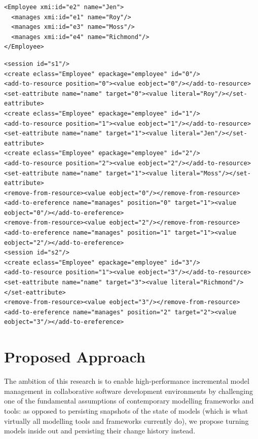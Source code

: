 \documentclass{llncs}
\begin{document}
\begin{lstlisting}[style=xmi,caption={State-based representation of the model of Figure \ref{fig:modified_chart} in (simplified) XMI.},label=lst:xmimodel]
<Employee xmi:id="e2" name="Jen">
  <manages xmi:id="e1" name="Roy"/>
  <manages xmi:id="e3" name="Moss"/>
  <manages xmi:id="e4" name="Richmond"/>
</Employee>
\end{lstlisting}


\begin{lstlisting}[style=xml,caption={Change-based representation of the model of Figure \ref{fig:modified_chart}.},label=lst:cbpmodel]
<session id="s1"/>
<create eclass="Employee" epackage="employee" id="0"/>
<add-to-resource position="0"><value eobject="0"/></add-to-resource>
<set-eattribute name="name" target="0"><value literal="Roy"/></set-eattribute>
<create eclass="Employee" epackage="employee" id="1"/>
<add-to-resource position="1"><value eobject="1"/></add-to-resource>
<set-eattribute name="name" target="1"><value literal="Jen"/></set-eattribute>
<create eclass="Employee" epackage="employee" id="2"/>
<add-to-resource position="2"><value eobject="2"/></add-to-resource>
<set-eattribute name="name" target="1"><value literal="Moss"/></set-eattribute>
<remove-from-resource><value eobject="0"/></remove-from-resource>
<add-to-ereference name="manages" position="0" target="1"><value eobject="0"/></add-to-ereference>
<remove-from-resource><value eobject="2"/></remove-from-resource>
<add-to-ereference name="manages" position="1" target="1"><value eobject="2"/></add-to-ereference>
<session id="s2"/>
<create eclass="Employee" epackage="employee" id="3"/>
<add-to-resource position="1"><value eobject="3"/></add-to-resource>
<set-eattribute name="name" target="3"><value literal="Richmond"/></set-eattribute>
<remove-from-resource><value eobject="3"/></remove-from-resource>
<add-to-ereference name="manages" position="2" target="2"><value eobject="3"/></add-to-ereference>
\end{lstlisting}

\section{Proposed Approach}
\label{sec:proposed_approach}
The ambition of this research is to enable high-performance incremental model management in collaborative software development environments by challenging one of the fundamental assumptions of contemporary modelling frameworks and tools: as opposed to persisting snapshots of the state of models (which is what virtually all modelling tools and frameworks currently do), we propose turning models inside out and persisting their change history instead.
\end{document}
